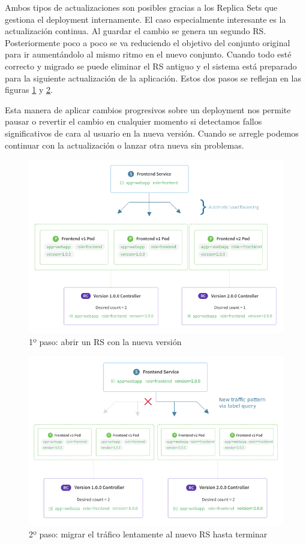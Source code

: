 Ambos tipos de actualizaciones son posibles gracias a los Replica Sets que gestiona el deployment internamente. El caso especialmente interesante es la actualización continua. Al guardar el cambio se genera un segundo RS. Posteriormente poco a poco se va reduciendo el objetivo del conjunto original para ir aumentándolo al mismo ritmo en el nuevo conjunto. Cuando todo esté correcto y migrado se puede eliminar el RS antiguo y el sistema está preparado para la siguiente actualización de la aplicación. Estos dos pasos se reflejan en las figuras \ref{fig:k8s-rolling-step1} y \ref{fig:k8s-rolling-step2}.

Esta manera de aplicar cambios progresivos sobre un deployment nos permite pausar o revertir el cambio en cualquier momento si detectamos fallos significativos de cara al usuario en la nueva versión. Cuando se arregle podemos continuar con la actualización o lanzar otra nueva sin problemas.

\begin{figure}[H]
    \centering
    \includegraphics[width=\textwidth]{../images/kubernetes/rolling-deploy.png}
    \caption{1º paso: abrir un RS con la nueva versión\cite{coreosrc}}
    \label{fig:k8s-rolling-step1}
\end{figure}

\begin{figure}[H]
    \centering
    \includegraphics[width=\textwidth]{../images/kubernetes/traffic-shift.png}
    \caption{2º paso: migrar el tráfico lentamente al nuevo RS hasta terminar\cite{coreosrc}}
    \label{fig:k8s-rolling-step2}
\end{figure}

